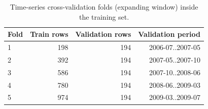 \begin{table}[t]
\centering
\small
\begin{tabular}{lrrr}
\toprule
Fold & Train rows & Validation rows & Validation period \\
\midrule
1 & 198 & 194 & 2006-07..2007-05 \\
2 & 392 & 194 & 2007-05..2007-10 \\
3 & 586 & 194 & 2007-10..2008-06 \\
4 & 780 & 194 & 2008-06..2009-03 \\
5 & 974 & 194 & 2009-03..2009-07 \\
\bottomrule
\end{tabular}
\caption{Time-series cross-validation folds (expanding window) inside the training set.}
\label{tab:folds}
\end{table}
